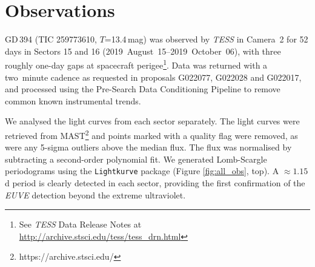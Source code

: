 \documentclass{aastex63}
\begin{document}

\section{Observations} \label{sec:obs}


GD\,394 (TIC 259773610, $T$=13.4\,mag) was observed by {\em TESS} in Camera~2 for 52 days in Sectors 15 and 16 (2019~August~15--2019~October~06), with three roughly one-day gaps at spacecraft perigee\footnote{See \textit{TESS} Data Release Notes at \url{http://archive.stsci.edu/tess/tess_drn.html}}. Data was returned with a two~minute cadence as requested in proposals G022077, G022028 and G022017, and processed using the Pre-Search  Data  Conditioning  Pipeline  \citep[PDC,][]{stumpeetal12-1} to remove common known instrumental trends.


We analysed the light curves from each sector separately. The light curves were retrieved from MAST\footnote{https://archive.stsci.edu/} and points marked with a quality flag were removed, as were any 5-sigma outliers above the median flux. The flux was normalised by subtracting a second-order polynomial fit. We generated Lomb-Scargle periodograms using the \texttt{Lightkurve} package  (Figure \ref{fig:all_obs}, top). A $\approx 1.15$\,d period is clearly detected in each sector, providing the first confirmation of the {\em EUVE} detection beyond the extreme ultraviolet. 
\end{document}

